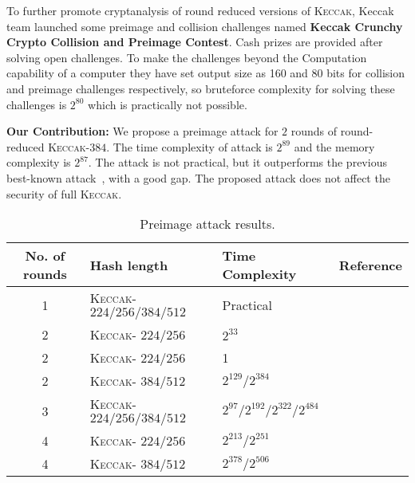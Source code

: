 \documentclass[runningheads]{llncs}
\newcommand{\KECCAK}{\mbox{\textsc{Keccak}}}
\newcommand{\Keccak}{\mbox{\textsc{Keccak}}}
\begin{document}
To further promote cryptanalysis of round reduced versions of \KECCAK{}, Keccak team launched some preimage and collision challenges named \textbf{Keccak Crunchy Crypto Collision and Preimage Contest}. Cash prizes are provided after solving open challenges. To make the challenges beyond the Computation capability of a computer they have set output size as 160 and 80 bits for collision and preimage challenges respectively, so bruteforce complexity for solving these challenges is $2^{80}$ which is practically not possible.
\newline

\textbf{Our Contribution:} We propose a preimage attack for $2$ rounds of round-reduced \KECCAK-$384$. The time complexity of attack is $2^{89}$ and the memory complexity is $2^{87}$. The attack is not practical, but it outperforms the previous best-known attack~\cite{guo2016linear}, with a good gap. The proposed attack does not affect the security of full \KECCAK{}.

\begin{table}
\begin{center}
\caption{Preimage attack results.}\label{tab1}
\begin{tabular}{|c|l|l|c|}
\hline
No. of rounds & Hash length & Time Complexity & Reference\\
\hline
1 & \Keccak - $224/256/384/512$ & Practical & ~\cite{kumar2018cryptanalysis} \\
2 & \Keccak - $224/256$ & $2^{33}$ & ~\cite{naya2011practical} \\
2 & \Keccak - $224/256$ & 1 & ~\cite{guo2016linear} \\
2 & \Keccak - $384/512$ & $2^{129} / 2^{384}$ & ~\cite{guo2016linear}\\
3 & \Keccak - $224/256/384/512$ & $2^{97} / 2^{192} / 2^{322} / 2^{484}$ & ~\cite{guo2016linear}\\
4 & \Keccak - $224/256$ & $2^{213} / 2^{251}$ & ~\cite{guo2016linear}\\
4 & \Keccak - $384/512$ & $2^{378} / 2^{506}$ & ~\cite{morawiecki2013rotational}\\
\hline
\end{tabular}
\end{center}
\end{table}
\end{document}
